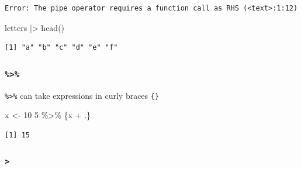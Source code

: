 \documentclass[
  letterpaper,
  DIV=11,
  numbers=noendperiod]{scrreprt}
\newenvironment{Shaded}{\begin{snugshade}}{\end{snugshade}}
\newcommand{\DecValTok}[1]{\textcolor[rgb]{0.68,0.00,0.00}{#1}}
\newcommand{\FunctionTok}[1]{\textcolor[rgb]{0.28,0.35,0.67}{#1}}
\newcommand{\NormalTok}[1]{\textcolor[rgb]{0.00,0.23,0.31}{#1}}
\newcommand{\OtherTok}[1]{\textcolor[rgb]{0.00,0.23,0.31}{#1}}
\newcommand{\SpecialCharTok}[1]{\textcolor[rgb]{0.37,0.37,0.37}{#1}}
\begin{document}
\begin{tcolorbox}
\begin{tcolorbox}
\begin{verbatim}
Error: The pipe operator requires a function call as RHS (<text>:1:12)
\end{verbatim}

\begin{Shaded}
\begin{Highlighting}[]
\NormalTok{letters }\SpecialCharTok{|\textgreater{}} \FunctionTok{head}\NormalTok{()}
\end{Highlighting}
\end{Shaded}

\begin{verbatim}
[1] "a" "b" "c" "d" "e" "f"
\end{verbatim}

\end{tcolorbox}

\begin{tcolorbox}[enhanced jigsaw, left=2mm, colframe=quarto-callout-note-color-frame, leftrule=.75mm, opacitybacktitle=0.6, toptitle=1mm, title=\textcolor{quarto-callout-note-color}{\faInfo}\hspace{0.5em}{Note}, opacityback=0, coltitle=black, colbacktitle=quarto-callout-note-color!10!white, breakable, colback=white, titlerule=0mm, bottomrule=.15mm, arc=.35mm, bottomtitle=1mm, rightrule=.15mm, toprule=.15mm]

\hypertarget{section-4}{%
\subsubsection{\texorpdfstring{\texttt{\%\textgreater{}\%}}{\%\textgreater\%}}\label{section-4}}

\texttt{\%\textgreater{}\%} can take expressions in curly braces
\texttt{\{\}}

\begin{Shaded}
\begin{Highlighting}[]
\NormalTok{x }\OtherTok{\textless{}{-}} \DecValTok{10}
\DecValTok{5} \SpecialCharTok{\%\textgreater{}\%}\NormalTok{ \{x }\SpecialCharTok{+}\NormalTok{ .\}}
\end{Highlighting}
\end{Shaded}

\begin{verbatim}
[1] 15
\end{verbatim}

\hypertarget{section-5}{%
\subsubsection{\texorpdfstring{\texttt{\textbar{}\textgreater{}}}{\textbar\textgreater{}}}\label{section-5}}


\end{tcolorbox}
\end{tcolorbox}
\end{document}

